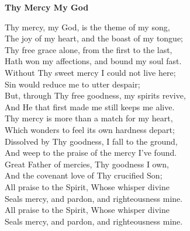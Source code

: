 \textbf{Thy Mercy My God}

Thy mercy, my God, is the theme of my song, \\
The joy of my heart, and the boast of my tongue; \\
Thy free grace alone, from the first to the last, \\
Hath won my affections, and bound my soul fast. \\

Without Thy sweet mercy I could not live here; \\
Sin would reduce me to utter despair; \\
But, through Thy free goodness, my spirits revive, \\
And He that first made me still keeps me alive. \\

Thy mercy is more than a match for my heart, \\
Which wonders to feel its own hardness depart; \\
Dissolved by Thy goodness, I fall to the ground, \\
And weep to the praise of the mercy I've found.\\

Great Father of mercies, Thy goodness I own, \\
And the covenant love of Thy crucified Son; \\
All praise to the Spirit, Whose whisper divine \\
Seals mercy, and pardon, and righteousness mine. \\

All praise to the Spirit, Whose whisper divine \\
Seals mercy, and pardon, and righteousness mine. \\

